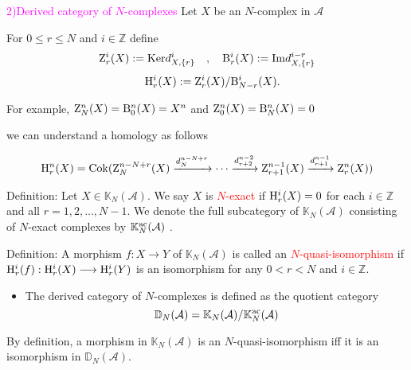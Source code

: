 \documentclass[t,ignorenonframetext]{beamer}
\newcommand{\lrt}{\longrightarrow}
\newcommand{\CA}{\mathcal{A} }
\newcommand{\D}{\mathbb{D} }
\newcommand{\K}{\mathbb{K} }
\newcommand{\Z}{\mathbb{Z} }
\newcommand{\HE}{{\rm{H}}}
\newcommand{\BE}{{\rm{B}}}
\newcommand{\ac}{{\rm{ac}}}
\newcommand{\Cok}{{\rm{Cok}}}
\newcommand{\im}{{\rm{Im}}}
\newcommand{\Ker}{{\rm{Ker}}}
\newcommand{\ZE}{{\rm{Z}}}
\begin{document}
\begin{frame}{\textcolor{magenta}{2)Derived category of $N$-complexes}}
Let $X$ be an $N$-complex in $\CA$
\pause

For $0\leq r \leq N$ and $i\in \Z$ define
$$\ZE^{i}_{r}(X):= \Ker d^{i}_{X,\lbrace r \rbrace} \quad , \quad \BE^{i}_{r}(X):= \im d^{i-r}_{X, \lbrace r \rbrace}
$$
$$
  \quad \HE^{i}_{r}(X):= \ZE^{i}_{r}(X)/ \BE^{i}_{N-r}(X).$$
\pause
 
For example, $\ZE^{n}_{N}(X)=\BE^{n}_{0}(X)=X^n$  and $\ZE^{n}_{0}(X)=\BE^{n}_{N}(X)=0$

\vspace{0.3cm}
\pause
we can understand a homology as follows
\begin{small}
$$\HE^{n}_{r}(X)=\Cok(\ZE^{n-N+r}_{N}(X)\xrightarrow{d^{n-N+r}_N}\cdots \xrightarrow{d^{n-2}_{r+2}} \ZE^{n-1}_{r+1}(X)\xrightarrow{d^{n-1}_{r+1}} \ZE^{n}_{r}(X))
$$
\end{small}

  

\end{frame}




\begin{frame}
\begin{block}{Definition:}
Let $X \in \K_N(\CA)$. We say $X$ is \textcolor{red}{$N$-exact} if $\HE^{i}_{r}(X)=0$
for each $i \in \mathbb{Z}$ and all $r=1,2,...,N-1$. We denote the full subcategory of $\K_N(\CA)$ consisting of $N$-exact complexes by $\K_{N}^{\ac}(\CA)$ . 
\end{block}


\pause
\begin{block}{Definition:}
A morphism $f:X\lrt Y$ of $\K_N(\CA)$ is called an \textcolor{red}{$N$-quasi-isomorphism} if $\HE^{i}_{r}(f):\HE^{i}_{r}(X)\lrt \HE^{i}_{r}(Y)$ is an isomorphism for any $0<r<N$ and $i\in \Z$.
\end{block}

\end{frame}



\begin{frame}

\vspace{0.6cm}
\pause
\begin{itemize}
\item The derived category of $N$-complexes is defined as the quotient category
$$\D_N(\CA)=\K_N(\CA)/\K_N^{\ac}(\CA) $$
\end{itemize}

\vspace{0.3cm}
\pause
By definition, a morphism in $\K_N(\CA)$ is an $N$-quasi-isomorphism iff it is an isomorphism in $\D_N(\CA)$.

\vspace{0.3cm}

\end{frame}
\end{document}

